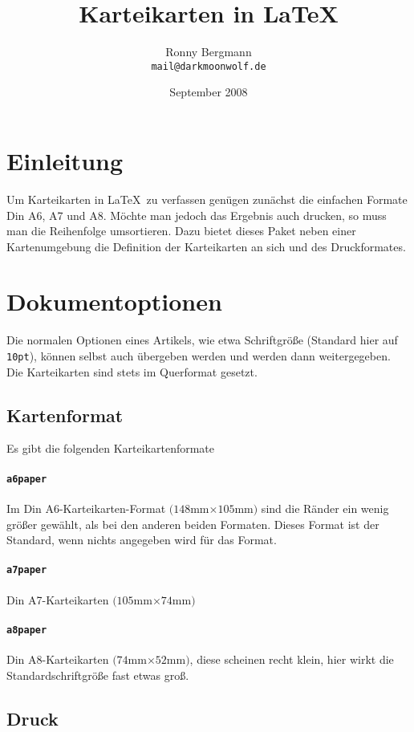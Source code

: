 \documentclass[a4paper]{article}
\newcommand\leftpar[1]{\marginpar[]{\sffamily #1}}
\begin{document}
\title{Karteikarten in \LaTeX}
\author{Ronny Bergmann\\\texttt{mail@darkmoonwolf.de}}
\date{September 2008}
\maketitle
\section{Einleitung}
Um Karteikarten in \LaTeX\ zu verfassen genügen zunächst die einfachen Formate Din A6, A7 und A8. Möchte man jedoch das Ergebnis auch drucken, so muss man die Reihenfolge umsortieren. Dazu bietet dieses Paket neben einer Kartenumgebung die Definition der Karteikarten an sich und des Druckformates.

\section{Dokumentoptionen}
\leftpar{\textbackslash documentclass}
Die normalen Optionen eines Artikels, wie etwa Schriftgröße (Standard hier auf \lstinline!10pt!), können selbst auch übergeben werden und werden dann 
weitergegeben. Die Karteikarten sind stets im Querformat gesetzt.
\subsection{Kartenformat}
Es gibt die folgenden Karteikartenformate
\paragraph{\lstinline!a6paper!} Im Din A6-Karteikarten-Format $(148$mm$\times 105$mm$)$ sind die Ränder ein wenig größer gewählt, als bei den anderen beiden Formaten. Dieses Format ist der Standard, wenn nichts angegeben wird für das Format.
\paragraph{\lstinline!a7paper!} Din A7-Karteikarten $(105$mm$\times 74$mm$)$
\paragraph{\lstinline!a8paper!} Din A8-Karteikarten $(74$mm$\times 52$mm$)$, diese scheinen recht klein, hier wirkt die Standardschriftgröße fast etwas groß.
\subsection{Druck}
\end{document}
